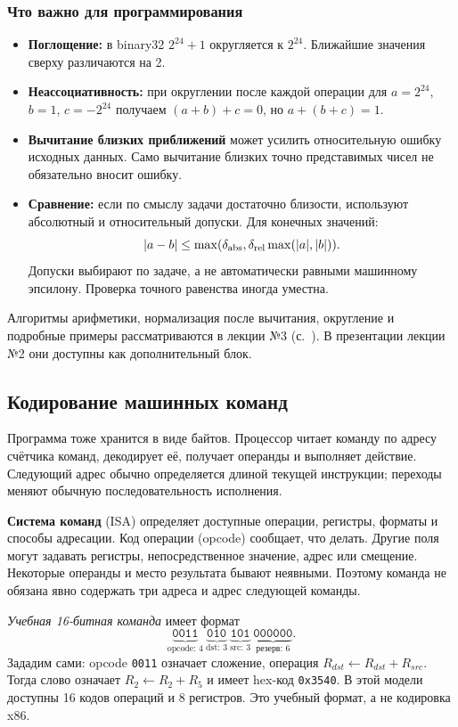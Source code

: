 \subsubsection*{Что важно для программирования}
\begin{itemize}
    \item \textbf{Поглощение:} в binary32 $2^{24}+1$ округляется к $2^{24}$.
    Ближайшие значения сверху различаются на 2.
    \item \textbf{Неассоциативность:} при округлении после каждой операции
    для $a=2^{24}$, $b=1$, $c=-2^{24}$ получаем
    $(a+b)+c=0$, но $a+(b+c)=1$.
    \item \textbf{Вычитание близких приближений} может усилить относительную
    ошибку исходных данных. Само вычитание близких точно представимых
    чисел не обязательно вносит ошибку.
    \item \textbf{Сравнение:} если по смыслу задачи достаточно близости,
    используют абсолютный и относительный допуски. Для конечных значений:
    \[|a-b|\le\max(\delta_{\rm abs},\delta_{\rm rel}\max(|a|,|b|)).\]
    Допуски выбирают по задаче, а не автоматически
    равными машинному эпсилону. Проверка точного равенства иногда уместна.
\end{itemize}
Алгоритмы арифметики, нормализация после вычитания, округление и подробные
примеры рассматриваются в лекции №3 (с.~\pageref{lecture03}).
В презентации лекции №2 они доступны как дополнительный блок.

\subsection{Кодирование машинных команд}
Программа тоже хранится в виде байтов. Процессор читает команду по адресу
счётчика команд, декодирует её, получает операнды и выполняет действие.
Следующий адрес обычно определяется длиной текущей инструкции;
переходы меняют обычную последовательность исполнения.

\textbf{Система команд} (ISA) определяет доступные операции, регистры,
форматы и способы адресации. Код операции (opcode) сообщает, что делать.
Другие поля могут задавать регистры, непосредственное значение, адрес
или смещение. Некоторые операнды и место результата бывают неявными.
Поэтому команда не обязана явно содержать три адреса и адрес следующей команды.

\textit{Учебная 16-битная команда} имеет формат
\[
\underbrace{\texttt{0011}}_{\text{opcode: 4}}
\ \underbrace{\texttt{010}}_{\text{dst: 3}}
\ \underbrace{\texttt{101}}_{\text{src: 3}}
\ \underbrace{\texttt{000000}}_{\text{резерв: 6}}.
\]
Зададим сами: opcode \texttt{0011} означает сложение,
операция $R_{dst}\gets R_{dst}+R_{src}$.
Тогда слово означает $R_2\gets R_2+R_5$ и имеет hex-код
\texttt{0x3540}. В этой модели доступны 16 кодов операций и 8 регистров.
Это учебный формат, а не кодировка x86.

